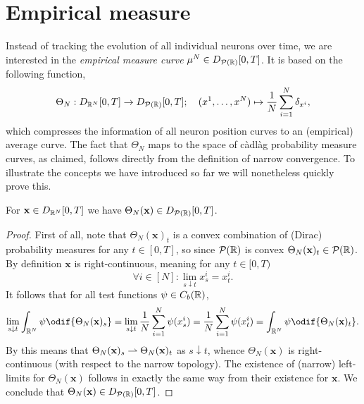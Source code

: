 \section{Empirical measure}

Instead of tracking the evolution of all individual neurons over time, we are interested in the \textit{empirical measure curve} \(\mu^N \in D_{\mathcal{P}(\mathbb{R})}[0,T]\).
It is based on the following function,
\begin{equation}
  \Theta_N : D_{\mathbb{R}^N}[0,T] \to D_{\mathcal{P}(\mathbb{R})}[0,T]; \quad (x^1,\dots,x^N) \mapsto \frac{1}{N} \sum_{i=1}^N \delta_{x^i},
\end{equation}
which compresses the information of all neuron position curves to an (empirical) average curve.
The fact that \(\Theta_N\) maps to the space of càdlàg probability measure curves, as claimed, follows directly from the definition of narrow convergence.
To illustrate the concepts we have introduced so far we will nonetheless quickly prove this.
\begin{lemma}\label{lem:range-of-Theta}
  For \(\mathbf{x} \in D_{\mathbb{R}^N}[0,T]\) we have \(\Theta_N(\mathbf{x}) \in D_{\mathcal{P}(\mathbb{R})}[0,T]\).
\end{lemma}

\begin{proof}
  First of all, note that \(\Theta_N(\bm{x})_t\) is a convex combination of (Dirac) probability measures for any \(t \in [0,T]\), so since \(\mathcal{P}(\mathbb{R})\) is convex \(\Theta_N(\mathbf{x})_t \in \mathcal{P}(\mathbb{R})\).
  By definition \(\bm{x}\) is right-continuous, meaning for any \(t \in [0,T)\)
  \begin{equation}
    \forall i \in [N] : \lim_{s \downarrow t} x_s^i = x_t^i.
  \end{equation}
  It follows that for all test functions \(\psi \in C_b(\mathbb{R})\),
  \begin{equation}
    \lim_{s \downarrow t} \int_{\potspace^N} \psi \odif{\Theta_N(\bm{x})_s}
    = \lim_{s \downarrow t} \frac{1}{N} \sum_{i=1}^N \psi(x_s^i)
    = \frac{1}{N} \sum_{i=1}^N \psi(x_t^i)
    = \int_{\potspace^N} \psi \odif{\Theta_N(\bm{x})_t}.
  \end{equation}
  By  this means that \(\Theta_N(\mathbf{x})_s \rightharpoonup \Theta_N(\mathbf{x})_t\) as \(s \downarrow t\), whence \(\Theta_N(\bm{x})\) is right-continuous (with respect to the narrow topology).
  The existence of (narrow) left-limits for \(\Theta_N(\bm{x})\) follows in exactly the same way from their existence for \(\bm{x}\).
  We conclude that \(\Theta_N(\mathbf{x}) \in D_{\mathcal{P}(\mathbb{R})}[0,T]\).
\end{proof}

